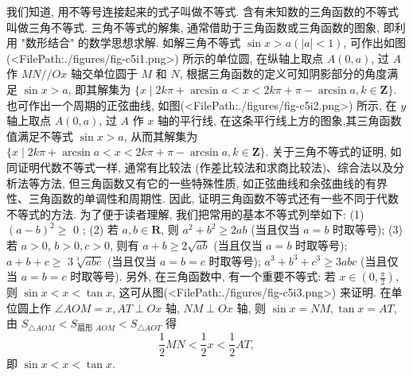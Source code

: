 
我们知道, 用不等号连接起来的式子叫做不等式.
含有未知数的三角函数的不等式叫做三角不等式.
三角不等式的解集, 通常借助于三角函数或三角函数的图象, 即利用 "数形结合" 的数学思想求解.
如解三角不等式 $\sin x>a(|a|<1)$, 可作出如图(<FilePath:./figures/fig-c5i1.png>) 所示的单位圆, 在纵轴上取点 $A(0, a)$, 过 $A$ 作 $M N / / O x$ 轴交单位圆于 $M$ 和 $N$, 根据三角函数的定义可知阴影部分的角度满足 $\sin x>a$, 即其解集为 $\{x \mid 2 k \pi+\arcsin a<x<2 k \pi+\pi-\arcsin a, k \in \mathbf{Z}\}$. 也可作出一个周期的正弦曲线, 如图(<FilePath:./figures/fig-c5i2.png>) 所示, 在 $y$ 轴上取点 $A(0, a)$, 过 $A$ 作 $x$ 轴的平行线, 在这条平行线上方的图象,其三角函数值满足不等式 $\sin x>a$, 从而其解集为 $\{x \mid 2 k \pi+\arcsin a<x<2 k \pi+\pi-\arcsin a, k \in \mathbf{Z}\}$.
关于三角不等式的证明, 如同证明代数不等式一样, 通常有比较法 (作差比较法和求商比较法)、综合法以及分析法等方法, 但三角函数又有它的一些特殊性质, 如正弦曲线和余弦曲线的有界性、三角函数的单调性和周期性.
因此, 证明三角函数不等式还有一些不同于代数不等式的方法.
为了便于读者理解, 我们把常用的基本不等式列举如下: (1) $(a-b)^2 \geqslant$ 0 ; (2) 若 $a, b \in \mathbf{R}$, 则 $a^2+b^2 \geqslant 2 a b$ (当且仅当 $a=b$ 时取等号); (3) 若 $a>0$, $b>0, c>0$, 则有 $a+b \geqslant 2 \sqrt{a b}$ (当且仅当 $a=b$ 时取等号); $a+b+c \geqslant$
$3 \sqrt[3]{a b c}$ (当且仅当 $a=b=c$ 时取等号); $a^3+b^3+c^3 \geqslant 3 a b c$ (当且仅当 $a= b=c$ 时取等号).
另外, 在三角函数中, 有一个重要不等式: 若 $x \in\left(0, \frac{\pi}{2}\right)$, 则 $\sin x<x<\tan x$, 这可从图(<FilePath:./figures/fig-c5i3.png>) 来证明.
在单位圆上作 $\angle A O M=x, A T \perp O x$ 轴, $N M \perp O x$ 轴, 则 $\sin x=N M, \tan x=A T$, 由 $S_{\triangle A O M}<S_{\text {扇形 } A O M}<S_{\triangle A O T}$ 得
$$
\frac{1}{2} M N<\frac{1}{2} x<\frac{1}{2} A T,
$$
即 $\sin x<x<\tan x$.



